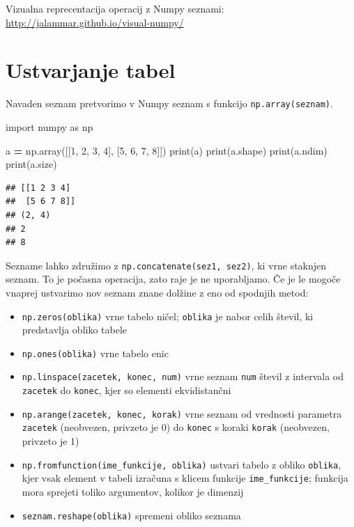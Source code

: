 \documentclass[
]{report}
\newenvironment{Shaded}{\begin{snugshade}}{\end{snugshade}}
\newcommand{\BuiltInTok}[1]{#1}
\newcommand{\DecValTok}[1]{\textcolor[rgb]{0.00,0.00,0.81}{#1}}
\newcommand{\ImportTok}[1]{#1}
\newcommand{\NormalTok}[1]{#1}
\newcommand{\OperatorTok}[1]{\textcolor[rgb]{0.81,0.36,0.00}{\textbf{#1}}}
\providecommand{\tightlist}{%
  \setlength{\itemsep}{0pt}\setlength{\parskip}{0pt}}
\begin{document}
Vizualna reprecentacija operacij z Numpy seznami: \url{http://jalammar.github.io/visual-numpy/}

\hypertarget{ustvarjanje-tabel}{%
\section{Ustvarjanje tabel}\label{ustvarjanje-tabel}}

Navaden seznam pretvorimo v Numpy seznam s funkcijo \texttt{np.array(seznam)}.

\begin{Shaded}
\begin{Highlighting}[]
\ImportTok{import}\NormalTok{ numpy }\ImportTok{as}\NormalTok{ np}

\NormalTok{a }\OperatorTok{=}\NormalTok{ np.array([[}\DecValTok{1}\NormalTok{, }\DecValTok{2}\NormalTok{, }\DecValTok{3}\NormalTok{, }\DecValTok{4}\NormalTok{], [}\DecValTok{5}\NormalTok{, }\DecValTok{6}\NormalTok{, }\DecValTok{7}\NormalTok{, }\DecValTok{8}\NormalTok{]])}
\BuiltInTok{print}\NormalTok{(a)}
\BuiltInTok{print}\NormalTok{(a.shape)}
\BuiltInTok{print}\NormalTok{(a.ndim)}
\BuiltInTok{print}\NormalTok{(a.size)}
\end{Highlighting}
\end{Shaded}

\begin{verbatim}
## [[1 2 3 4]
##  [5 6 7 8]]
## (2, 4)
## 2
## 8
\end{verbatim}

Sezname lahko združimo z \texttt{np.concatenate(sez1,\ sez2)}, ki vrne staknjen seznam. To je počasna operacija, zato raje je ne uporabljamo. Če je le mogoče vnaprej ustvarimo nov seznam znane dolžine z eno od spodnjih metod:

\begin{itemize}
\tightlist
\item
  \texttt{np.zeros(oblika)} vrne tabelo ničel; \texttt{oblika} je nabor celih števil, ki predstavlja obliko tabele
\item
  \texttt{np.ones(oblika)} vrne tabelo enic
\item
  \texttt{np.linspace(zacetek,\ konec,\ num)} vrne seznam \texttt{num} števil z intervala od \texttt{zacetek} do \texttt{konec}, kjer so elementi ekvidistančni
\item
  \texttt{np.arange(zacetek,\ konec,\ korak)} vrne seznam od vrednosti parametra \texttt{zacetek} (neobvezen, privzeto je 0) do \texttt{konec} s koraki \texttt{korak} (neobvezen, privzeto je 1)
\item
  \texttt{np.fromfunction(ime\_funkcije,\ oblika)} ustvari tabelo z obliko \texttt{oblika}, kjer
  vsak element v tabeli izračuna s klicem funkcije \texttt{ime\_funkcije}; funkcija mora sprejeti toliko argumentov, kolikor je dimenzij
\item
  \texttt{seznam.reshape(oblika)} spremeni obliko seznama
\end{itemize}
\end{document}
